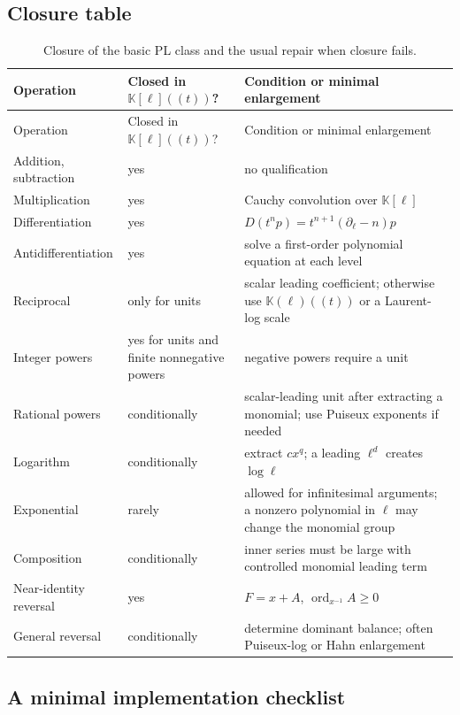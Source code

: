 \documentclass[11pt,oneside]{article}
\numberwithin{equation}{section}
\theoremstyle{definition}
\newcommand{\K}{\mathbb K}
\newcommand{\ordx}{\operatorname{ord}_{x^{-1}}}
\begin{document}
\subsection{Closure table}

\begin{longtable}{@{}p{}p{}p{}@{}}
\caption{Closure of the basic PL class and the usual repair when closure fails.}\label{tab:closure-summary}\\
\toprule
Operation & Closed in \(\K[\ell]((t))\)? & Condition or minimal enlargement\\
\midrule
\endfirsthead
\toprule
Operation & Closed in \(\K[\ell]((t))\)? & Condition or minimal enlargement\\
\midrule
\endhead
Addition, subtraction & yes & no qualification\\
Multiplication & yes & Cauchy convolution over \(\K[\ell]\)\\
Differentiation & yes & \(D(t^np)=t^{n+1}(\partial_\ell-n)p\)\\
Antidifferentiation & yes & solve a first-order polynomial equation at each level\\
Reciprocal & only for units & scalar leading coefficient; otherwise use \(\K(\ell)((t))\) or a Laurent-log scale\\
Integer powers & yes for units and finite nonnegative powers & negative powers require a unit\\
Rational powers & conditionally & scalar-leading unit after extracting a monomial; use Puiseux exponents if needed\\
Logarithm & conditionally & extract \(c x^q\); a leading \(\ell^d\) creates \(\log\ell\)\\
Exponential & rarely & allowed for infinitesimal arguments; a nonzero polynomial in \(\ell\) may change the monomial group\\
Composition & conditionally & inner series must be large with controlled monomial leading term\\
Near-identity reversal & yes & \(F=x+A\), \(\ordx A\ge0\)\\
General reversal & conditionally & determine dominant balance; often Puiseux-log or Hahn enlargement\\
\bottomrule
\end{longtable}

\subsection{A minimal implementation checklist}
\end{document}
